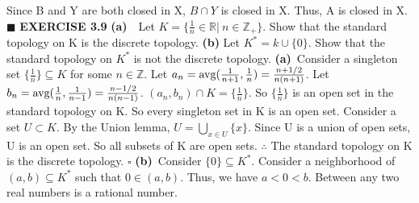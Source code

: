 \documentclass[12pt]{article}
\begin{document}
  \newline
  Since B and Y are both closed in X, \(B \cap Y\) is closed in X.
  \newline
  Thus, A is closed in X.
  \newline \(\blacksquare\)
  \newpage
  \noindent
  \textbf{EXERCISE 3.9}
  \newline
  \textbf{(a)}\ \ Let \(K = \{\frac{1}{n} \in \mathbb{R}|\ n \in \mathbb{Z}_+\}\). Show that the standard topology on K is the discrete topology.
  \newline
  \textbf{(b)} Let \(K^*=k \cup \{0\}\). Show that the standard topology on \(K^*\) is not the discrete topology.
  \newline \newline
  \textbf{(a)}\ Consider a singleton set  \(\{\frac{1}{n}\} \subseteq K\) for some \(n \in \mathbb{Z}\).
  \newline \newline
  Let \(a_n = \textup{avg}(\frac{1}{n+1}, \frac{1}{n}) = \frac{n+ 1/2}{n(n+1)}\).
  \newline
  Let \(b_n = \textup{avg}(\frac{1}{n}, \frac{1}{n-1}) = \frac{n- 1/2}{n(n-1)}\).
  \newline
  \((a_n,b_n) \cap K = \{\frac{1}{n}\}\).
  \newline
  So \(\{\frac{1}{n}\}\) is an open set in the standard topology on K.
  \newline
  So every singleton set in K is an open set.
  \newline \newline
  Consider a set \(U \subset K\).
  \newline
  By the Union lemma, \(U = \bigcup_{x \in U}\{x\}\).
  \newline
  Since U is a union of open sets, U is an open set.
  \newline
  So all subsets of K are open sets.
  \newline
  \(\therefore\) The standard topology on K is the discrete topology.
  \newline \(\square\) \newline
  \textbf{(b)}\ Consider \(\{0\} \subseteq K^*\).
  \newline
  Consider a neighborhood of \((a,b) \subseteq K^*\) such that \(0 \in (a,b)\).
  \newline
  Thus, we have \(a < 0 < b\).
  \newline \newline
  Between any two real numbers is a rational number.
  \newline
\end{document}
